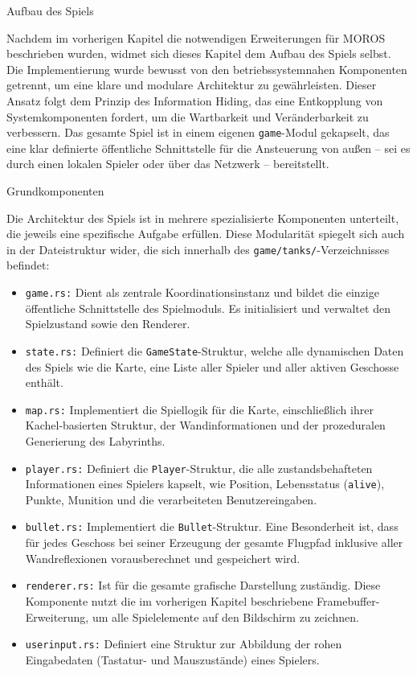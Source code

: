 \begin{section}{Aufbau des Spiels}

Nachdem im vorherigen Kapitel die notwendigen Erweiterungen für MOROS beschrieben wurden, widmet sich dieses Kapitel dem Aufbau des Spiels selbst.
Die Implementierung wurde bewusst von den betriebssystemnahen Komponenten getrennt, um eine klare und modulare Architektur zu gewährleisten.
Dieser Ansatz folgt dem Prinzip des Information Hiding, das eine Entkopplung von Systemkomponenten fordert, um die Wartbarkeit und Veränderbarkeit zu verbessern.
Das gesamte Spiel ist in einem eigenen \texttt{game}-Modul gekapselt, das eine klar definierte öffentliche Schnittstelle für die Ansteuerung von außen – sei es durch einen lokalen Spieler oder über das Netzwerk – bereitstellt.
\begin{subsection}{Grundkomponenten}

Die Architektur des Spiels ist in mehrere spezialisierte Komponenten unterteilt, die jeweils eine spezifische Aufgabe erfüllen.
Diese Modularität spiegelt sich auch in der Dateistruktur wider, die sich innerhalb des \texttt{game/tanks/}-Verzeichnisses befindet:

\begin{itemize}
    \item \texttt{game.rs:} Dient als zentrale Koordinationsinstanz und bildet die einzige öffentliche Schnittstelle des Spielmoduls.
Es initialisiert und verwaltet den Spielzustand sowie den Renderer.
    \item \texttt{state.rs:} Definiert die \texttt{GameState}-Struktur, welche alle dynamischen Daten des Spiels wie die Karte, eine Liste aller Spieler und aller aktiven Geschosse enthält.
    \item \texttt{map.rs:} Implementiert die Spiellogik für die Karte, einschließlich ihrer Kachel-basierten Struktur, der Wandinformationen und der prozeduralen Generierung des Labyrinths.
    \item \texttt{player.rs:} Definiert die \texttt{Player}-Struktur, die alle zustandsbehafteten Informationen eines Spielers kapselt, wie Position, Lebensstatus (\texttt{alive}), Punkte, Munition und die verarbeiteten Benutzereingaben.
    \item \texttt{bullet.rs:} Implementiert die \texttt{Bullet}-Struktur.
    Eine Besonderheit ist, dass für jedes Geschoss bei seiner Erzeugung der gesamte Flugpfad inklusive aller Wandreflexionen vorausberechnet und gespeichert wird.
    \item \texttt{renderer.rs:} Ist für die gesamte grafische Darstellung zuständig.
    Diese Komponente nutzt die im vorherigen Kapitel beschriebene Framebuffer-Erweiterung, um alle Spielelemente auf den Bildschirm zu zeichnen.
    \item \texttt{userinput.rs:} Definiert eine Struktur zur Abbildung der rohen Eingabedaten (Tastatur- und Mauszustände) eines Spielers.
\end{itemize}


\end{subsection}
\end{section}
